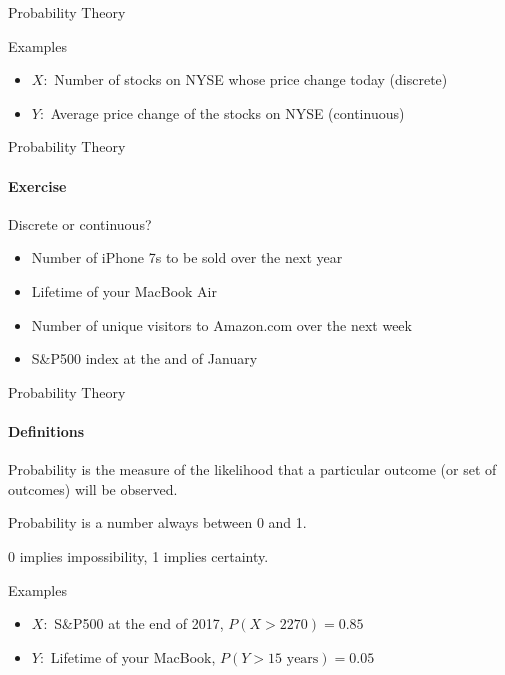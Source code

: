 \documentclass{beamer}\usepackage[]{graphicx}\usepackage[]{color}
\begin{document}
\begin{darkframes}
\begin{frame}[label=lists]{Probability Theory}
\begin{exampleblock}{Examples}
\begin{itemize}
				\item $X:$ Number of stocks on NYSE whose price change today (discrete) \pause
				\item $Y:$ Average price change of the stocks on NYSE (continuous)

			\end{itemize}
        \end{exampleblock}
  
	\end{frame}  
	
	
	
   \begin{frame}[label=lists]{Probability Theory}
		\framesubtitle{Exercise}    
      	Discrete or continuous?  \pause
      		\begin{itemize}
				
				\item Number of iPhone 7s to be sold over the next year  \pause
				\item Lifetime of your MacBook Air  \pause
				\item Number of unique visitors to Amazon.com over the next week  \pause
      			\item S\&P500 index at the and of January  %
    
			\end{itemize}
	\end{frame} 
	
	
	
	\begin{frame}[label=lists]{Probability Theory}
		\framesubtitle{Definitions}    
		
      	\begin{definition}
       		\alert{Probability} is the measure of the likelihood that a particular outcome (or set of outcomes) will be observed. \newline \pause
       		
       		Probability is a number always between 0 and 1. \newline \pause
       		
       		0 implies impossibility, 1 implies certainty.
      	\end{definition} \pause
    
    
    	\begin{exampleblock}{Examples}
      		\begin{itemize}

				\item $X:$ S\&P500 at the end of 2017, $P(X>2270) = 0.85$  \pause %
				\item $Y:$ Lifetime of your MacBook, $ P(Y>15\text{ years})  = 0.05$


\end{itemize}
\end{exampleblock}
\end{frame}
\end{darkframes}
\end{document}
